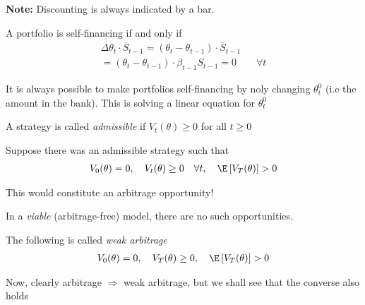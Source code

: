 \noindent\textbf{Note:} Discounting is always indicated by a bar.
\par\bigskip
\noindent A portfolio is self-financing if and only if 
\begin{equation*}
  \begin{gathered}
    \Delta\theta_t \cdot\overline{S}_{t-1} = (\theta_t-\theta_{t-1})\cdot\overline{S}_{t-1}\\
    =(\theta_t-\theta_{t-1})\cdot\beta_{t-1}S_{t-1} = 0\qquad\forall t
  \end{gathered}
\end{equation*}\par
\noindent It is always possible to make portfolios self-financing by noly changing $\theta_t^0$ (i.e the amount in the bank). This is solving a linear equation for $\theta_t^0$
\par\bigskip
\noindent A strategy is called \textit{admissible} if $V_t(\theta)\geq0$ for all $t\geq0$\par

\noindent Suppose there was an admissible strategy such that
\begin{equation*}
  \begin{gathered}
    V_0(\theta) = 0,\quad V_t(\theta)\geq0\quad\forall t,\quad \E\left[V_T(\theta)\right]>0
  \end{gathered}
\end{equation*}\par
\noindent This would constitute an arbitrage opportunity!\par
\noindent In a \textit{viable} (arbitrage-free) model, there are no such opportunities.
\par\bigskip
\noindent The following is called \textit{weak arbitrage}
\begin{equation*}
  \begin{gathered}
    V_0(\theta) = 0,\quad V_T(\theta)\geq0,\quad\E\left[V_T(\theta)\right]>0
  \end{gathered}
\end{equation*}\par
\noindent Now, clearly arbitrage $\Rightarrow$ weak arbitrage, but we shall see that the converse also holds
